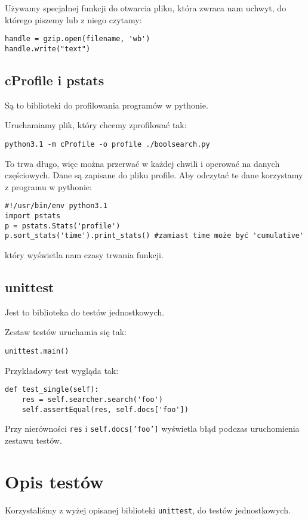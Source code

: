 \documentclass[11pt]{article}
\begin{document}
Używamy specjalnej funkcji do otwarcia pliku, która zwraca nam uchwyt, do którego piszemy lub z niego czytamy:
\begin{verbatim}
handle = gzip.open(filename, 'wb') 
handle.write("text")
\end{verbatim}
\subsection{cProfile i pstats}
Są to biblioteki do profilowania programów w pythonie.

Uruchamiamy plik, który chcemy zprofilować tak:
\begin{verbatim}
python3.1 -m cProfile -o profile ./boolsearch.py
\end{verbatim}
To trwa długo, więc można przerwać w każdej chwili i operować na danych częściowych. Dane są zapisane do pliku profile. Aby odczytać te dane korzystamy z programu w pythonie:
\begin{verbatim}
#!/usr/bin/env python3.1
import pstats
p = pstats.Stats('profile')
p.sort_stats('time').print_stats() #zamiast time może być 'cumulative'
\end{verbatim}
który wyświetla nam czasy trwania funkcji.
\subsection{unittest}
Jest to biblioteka do testów jednostkowych.

Zestaw testów uruchamia się tak:
\begin{verbatim}
unittest.main()
\end{verbatim}

Przykładowy test wygląda tak:
\begin{verbatim}
def test_single(self):
    res = self.searcher.search('foo')
    self.assertEqual(res, self.docs['foo'])
\end{verbatim}
Przy nierówności \texttt{res} i \texttt{self.docs['foo']} wyświetla błąd podczas uruchomienia zestawu testów.

\section{Opis testów}
Korzystaliśmy z wyżej opisanej biblioteki \texttt{unittest}, do testów jednostkowych. 
\end{document}
